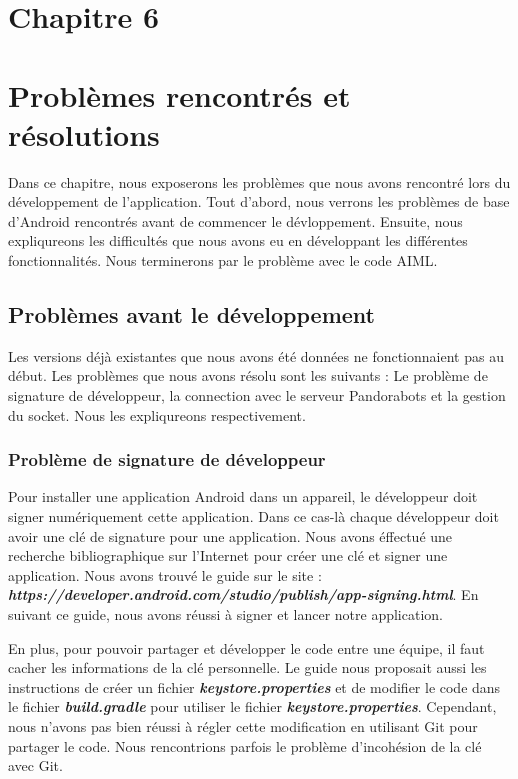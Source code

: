 \section*{Chapitre 6}
\section{Problèmes rencontrés et résolutions}

\indent Dans ce chapitre, nous exposerons les problèmes que nous avons rencontré lors du développement de l'application. Tout d'abord, nous verrons les problèmes de base d'Android rencontrés avant de commencer le dévloppement. Ensuite, nous expliqureons les difficultés que nous avons eu en développant les différentes fonctionnalités. Nous terminerons par le problème avec le code AIML.

\subsection{Problèmes avant le développement}

\indent Les versions déjà existantes que nous avons été données ne fonctionnaient pas au début. Les problèmes que nous avons résolu sont les suivants : Le problème de signature de développeur, la connection avec le serveur Pandorabots et la gestion du socket. Nous les expliqureons respectivement.

\subsubsection{Problème de signature de développeur}

\indent Pour installer une application Android dans un appareil, le développeur doit signer numériquement cette application. Dans ce cas-là chaque développeur doit avoir une clé de signature pour une application. Nous avons éffectué une recherche bibliographique sur l'Internet pour créer une clé et signer une application. Nous avons trouvé le guide sur le site : \textbf{\emph{https://developer.android.com/studio/publish/app-signing.html}}. En suivant ce guide, nous avons réussi à signer et lancer notre application.

\indent En plus, pour pouvoir partager et développer le code entre une équipe, il faut cacher les informations de la clé personnelle. Le guide nous proposait aussi les instructions de créer un fichier \textbf{\emph{keystore.properties}} et de modifier le code dans le fichier \textbf{\emph{build.gradle}} pour utiliser le fichier \textbf{\emph{keystore.properties}}. Cependant, nous n'avons pas bien réussi à régler cette modification en utilisant Git pour partager le code. Nous rencontrions parfois le problème d'incohésion de la clé avec Git.

